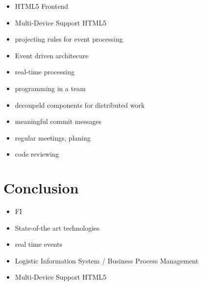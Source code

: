 \documentclass{acm_proc_article-sp}
\begin{document}
\begin{itemize}
	\item HTML5 Frontend
	\item Multi-Device Support HTML5
	\item projecting rules for event processing
	\item Event driven architecure 
	\item real-time processing
\end{itemize}


\begin{itemize}
	\item programming in a team
	\item decoupeld components for distributed work
	\item meaningful commit messages
	\item regular meetings, planing
	\item code reviewing
\end{itemize}


\section{Conclusion}
\label{sec:Conclusion}
\begin{itemize}
	\item FI
	\item State-of-the art technologies
	\item real time events
	\item Logistic Information System / Business Process Management
	\item Multi-Device Support HTML5
	
\end{itemize}

%

%
%
\appendix
\end{document}
